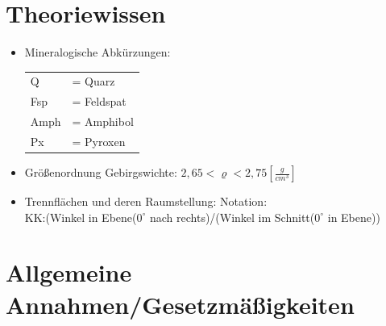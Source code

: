 \documentclass[fleqn,twoside]{article}
\title{\Huge{\textfrak{Felsmechanik und Tunnelbau \\Formelsammlung}}}
\author{\calligra{Jonathan C. Walter}\\\calligra{Jonas H. Konrad}}
\date{\textfrak{\today}}
\begin{document}
\parindent 0pt
\fancyfoot[R]{\frakfamily }
\maketitle \thispagestyle{empty}
\begin{center}
\end{center}
\tableofcontents

\section{Theoriewissen}

\begin{itemize}
\item Mineralogische Abkürzungen:\\
    \begin{tabular}[t]{p{1cm}p{3cm}}
         Q & = Quarz\\
         Fsp & = Feldspat\\
         Amph & = Amphibol\\
         Px & = Pyroxen
    \end{tabular}
\item Größenordnung Gebirgswichte: $2,65 < \varrho < 2,75 \left[ \frac{g}{cm^3} \right]$
\item Trennflächen und deren Raumstellung: Notation:\\KK:(Winkel in Ebene($0^\circ$ nach rechts)/(Winkel im Schnitt($0^\circ$ in Ebene))
\end{itemize}

\section{Allgemeine Annahmen/Gesetzmäßigkeiten}
\end{document}
